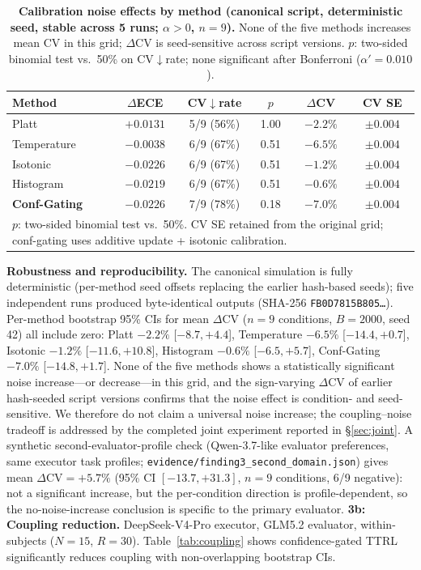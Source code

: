 \documentclass[11pt]{article}
\newcommand{\CV}{\ensuremath{\mathrm{CV}}}
\theoremstyle{definition}
\theoremstyle{remark}
\begin{document}
\begin{table}[H]
\centering
\caption{\textbf{Calibration noise effects by method (canonical script, deterministic seed, stable across 5 runs; $\alpha{>}0$, $n{=}9$).} None of the five methods increases mean CV in this grid; $\Delta\CV$ is seed-sensitive across script versions. $p$: two-sided binomial test vs.\ 50\% on CV$\downarrow$rate; none significant after Bonferroni ($\alpha' = 0.010$).}
\label{tab:noise}
\begin{tabular}{@{}lccccc@{}}
\toprule
Method & $\Delta$ECE & CV$\downarrow$rate & $p$ & $\Delta$CV & CV SE \\
\midrule
Platt & $+0.0131$ & 5/9 (56\%) & 1.00 & $-2.2\%$ & $\pm 0.004$ \\
Temperature & $-0.0038$ & 6/9 (67\%) & 0.51 & $-6.5\%$ & $\pm 0.004$ \\
Isotonic & $-0.0226$ & 6/9 (67\%) & 0.51 & $-1.2\%$ & $\pm 0.004$ \\
Histogram & $-0.0219$ & 6/9 (67\%) & 0.51 & $-0.6\%$ & $\pm 0.004$ \\
\midrule
\textbf{Conf-Gating} & $\mathbf{-0.0226}$ & 7/9 (78\%) & 0.18 & $\mathbf{-7.0\%}$ & $\pm 0.004$ \\
\bottomrule
\multicolumn{6}{l}{\footnotesize $p$: two-sided binomial test vs.\ 50\%. CV SE retained from the original grid; conf-gating uses additive update + isotonic calibration.} \\
\end{tabular}
\end{table}


\textbf{Robustness and reproducibility.} The canonical simulation is fully deterministic (per-method seed offsets replacing the earlier hash-based seeds); five independent runs produced byte-identical outputs (SHA-256 \texttt{FB0D7815B805\ldots}). Per-method bootstrap 95\% CIs for mean $\Delta\CV$ ($n{=}9$ conditions, $B{=}2000$, seed 42) all include zero: Platt $-2.2\%$ [$-8.7, +4.4$], Temperature $-6.5\%$ [$-14.4, +0.7$], Isotonic $-1.2\%$ [$-11.6, +10.8$], Histogram $-0.6\%$ [$-6.5, +5.7$], Conf-Gating $-7.0\%$ [$-14.8, +1.7$]. None of the five methods shows a statistically significant noise increase---or decrease---in this grid, and the sign-varying $\Delta\CV$ of earlier hash-seeded script versions confirms that the noise effect is condition- and seed-sensitive. We therefore do not claim a universal noise increase; the coupling--noise tradeoff is addressed by the completed joint experiment reported in \S\ref{sec:joint}. A synthetic second-evaluator-profile check (Qwen-3.7-like evaluator preferences, same executor task profiles; \texttt{evidence/finding3\_second\_domain.json}) gives mean $\Delta\CV = +5.7\%$ (95\% CI $[-13.7, +31.3]$, $n{=}9$ conditions, 6/9 negative): not a significant increase, but the per-condition direction is profile-dependent, so the no-noise-increase conclusion is specific to the primary evaluator.
\textbf{3b: Coupling reduction.} DeepSeek-V4-Pro executor, GLM5.2 evaluator, within-subjects ($N{=}15$, $R{=}30$). Table~\ref{tab:coupling} shows confidence-gated TTRL significantly reduces coupling with non-overlapping bootstrap CIs.
\end{document}
